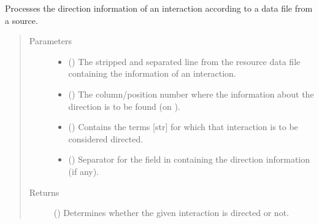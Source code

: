 \documentclass[letterpaper,10pt,english]{sphinxmanual}
\begin{document}
\begin{fulllineitems}
\begin{fulllineitems}
\label{\detokenize{main:pypath.main.PyPath.process_direction}}
Processes the direction information of an interaction according
to a data file from a source.
\begin{quote}\begin{description}
\item[{Parameters}] \leavevmode\begin{itemize}
\item {} 
 () \textendash{} The stripped and separated line from the resource data file
containing the information of an interaction.

\item {} 
 () \textendash{} The column/position number where the information about the
direction is to be found (on ).

\item {} 
 () \textendash{} Contains the terms {[}str{]} for which that interaction is to be
considered directed.

\item {} 
 () \textendash{} Separator for the field in  containing the direction
information (if any).

\end{itemize}

\item[{Returns}] \leavevmode
() \textendash{} Determines whether the given interaction is
directed or not.

\end{description}\end{quote}

\end{fulllineitems}


\begin{fulllineitems}
\label{\detokenize{main:pypath.main.PyPath.process_directions}}
\end{fulllineitems}


\end{fulllineitems}
\end{document}
